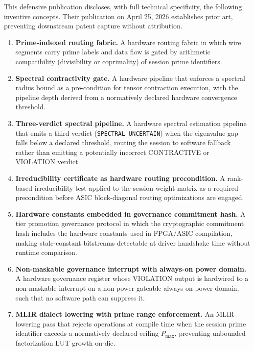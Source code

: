 \documentclass[12pt,letterpaper]{article}
\theoremstyle{plain}
\theoremstyle{definition}
\theoremstyle{remark}
\begin{document}
This defensive publication discloses, with full technical specificity, the
following inventive concepts. Their publication on April 25, 2026 establishes
prior art, preventing downstream patent capture without attribution.

\begin{enumerate}
  \item \textbf{Prime-indexed routing fabric.} A hardware routing fabric in which
        wire segments carry prime labels and data flow is gated by arithmetic
        compatibility (divisibility or coprimality) of session prime identifiers.

  \item \textbf{Spectral contractivity gate.} A hardware pipeline that enforces
        a spectral radius bound as a pre-condition for tensor contraction
        execution, with the pipeline depth derived from a normatively declared
        hardware convergence threshold.

  \item \textbf{Three-verdict spectral pipeline.} A hardware spectral estimation
        pipeline that emits a third verdict (\texttt{SPECTRAL\_UNCERTAIN})
        when the eigenvalue gap falls below a declared threshold, routing the
        session to software fallback rather than emitting a potentially incorrect
        CONTRACTIVE or VIOLATION verdict.

  \item \textbf{Irreducibility certificate as hardware routing precondition.}
        A rank-based irreducibility test applied to the session weight matrix
        as a required precondition before ASIC block-diagonal routing
        optimizations are engaged.

  \item \textbf{Hardware constants embedded in governance commitment hash.}
        A tier promotion governance protocol in which the cryptographic
        commitment hash includes the hardware constants used in FPGA/ASIC
        compilation, making stale-constant bitstreams detectable at driver
        handshake time without runtime comparison.

  \item \textbf{Non-maskable governance interrupt with always-on power domain.}
        A hardware governance register whose VIOLATION output is hardwired to
        a non-maskable interrupt on a non-power-gateable always-on power domain,
        such that no software path can suppress it.

  \item \textbf{MLIR dialect lowering with prime range enforcement.}
        An MLIR lowering pass that rejects operations at compile time when
        the session prime identifier exceeds a normatively declared ceiling
        \(P_{\max}\), preventing unbounded factorization LUT growth on-die.
\end{enumerate}
\end{document}
